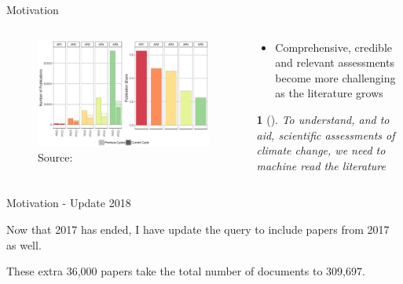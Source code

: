 \documentclass[9pt]{beamer}
\newtheorem*{remark}{}
\begin{document}
\begin{frame}{Motivation}

\begin{columns}
	\begin{column}{0.5\linewidth}
		\begin{center}
\begin{figure}
	\includegraphics[width=0.85\linewidth]{merged_IPCC_spectral.png}
	\caption{Source: \citet{Minx2017l} }
\end{figure}
		\end{center}
	\end{column}
	\begin{column}{0.5\linewidth}
		\begin{center}
			\begin{itemize}
				\item Comprehensive, credible and relevant assessments become
				more challenging as the literature grows
			\end{itemize}
		\begin{remark}[]
			To understand, and to aid, scientific assessments of climate change, we need to machine read the literature
		\end{remark}
		\end{center}
	\end{column}
\end{columns}

\end{frame}

\begin{frame}{Motivation - Update 2018}

Now that 2017 has ended, I have update the query to include papers from 2017 as well.

\medskip

\medskip

These extra 36,000 papers take the total number of documents to 309,697.


\end{frame}
\end{document}
